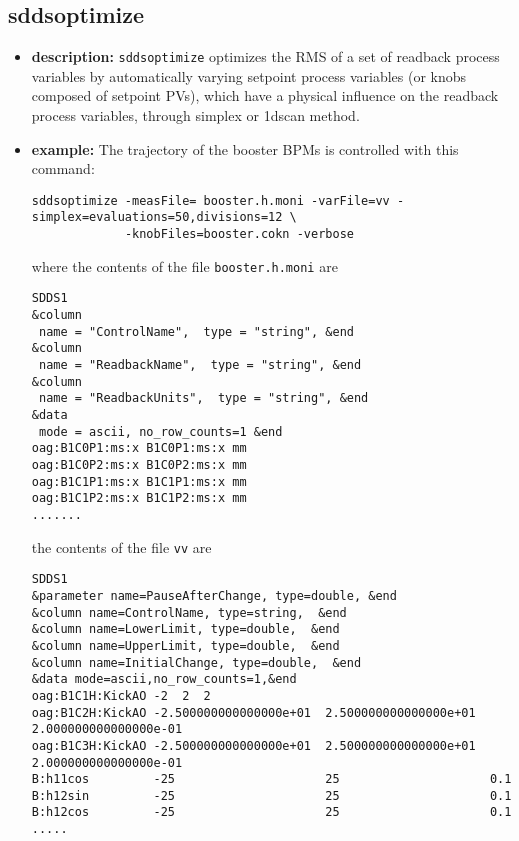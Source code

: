 %
%
\begin{latexonly}
\newpage
\end{latexonly}

%
%
\subsection{sddsoptimize}
\label{sddsoptimize}

\begin{itemize}
\item {\bf description:}
%
%
\verb+sddsoptimize+ optimizes the RMS of a set of readback process variables by automatically varying setpoint process variables (or knobs composed of setpoint PVs), which have a physical influence on the readback process variables, through simplex or 1dscan method.   

\item {\bf example:} 
%
% 
%
The trajectory of the booster BPMs is controlled with this command:
\begin{verbatim}
sddsoptimize -measFile= booster.h.moni -varFile=vv -simplex=evaluations=50,divisions=12 \
             -knobFiles=booster.cokn -verbose
\end{verbatim}
where the contents of the file \verb+booster.h.moni+ are
\begin{verbatim}
SDDS1
&column
 name = "ControlName",  type = "string", &end
&column
 name = "ReadbackName",  type = "string", &end
&column             
 name = "ReadbackUnits",  type = "string", &end
&data
 mode = ascii, no_row_counts=1 &end
oag:B1C0P1:ms:x B1C0P1:ms:x mm
oag:B1C0P2:ms:x B1C0P2:ms:x mm
oag:B1C1P1:ms:x B1C1P1:ms:x mm
oag:B1C1P2:ms:x B1C1P2:ms:x mm
.......

\end{verbatim}
the contents of the file \verb+vv+ are
\begin{verbatim}
SDDS1
&parameter name=PauseAfterChange, type=double, &end
&column name=ControlName, type=string,  &end
&column name=LowerLimit, type=double,  &end
&column name=UpperLimit, type=double,  &end
&column name=InitialChange, type=double,  &end
&data mode=ascii,no_row_counts=1,&end
oag:B1C1H:KickAO -2  2  2 
oag:B1C2H:KickAO -2.500000000000000e+01  2.500000000000000e+01  2.000000000000000e-01 
oag:B1C3H:KickAO -2.500000000000000e+01  2.500000000000000e+01  2.000000000000000e-01 
B:h11cos         -25                     25                     0.1
B:h12sin         -25                     25                     0.1
B:h12cos         -25                     25                     0.1
.....


\end{verbatim}
\end{itemize}

